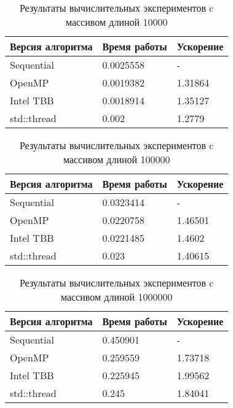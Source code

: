 \documentclass{report}
\begin{document}
\begin{table}[!h]
\caption{Результаты вычислительных экспериментов c массивом длиной 10000}
\centering
\begin{tabular}{| p{5cm} | p{5cm} | p{5cm} |}
\hline
Версия алгоритма & Время работы & Ускорение  \\[5pt]
\hline
Sequential      & 0.0025558      & -            \\
OpenMP          & 0.0019382      & 1.31864      \\
Intel TBB       & 0.0018914      & 1.35127      \\
std::thread     & 0.002          & 1.2779       \\
\hline
\end{tabular}
\end{table}

\begin{table}[!h]
\caption{Результаты вычислительных экспериментов c массивом длиной 100000}
\centering
\begin{tabular}{| p{5cm} | p{5cm} | p{5cm} |}
\hline
Версия алгоритма & Время работы & Ускорение  \\[5pt]
\hline
Sequential      & 0.0323414      & -            \\
OpenMP          & 0.0220758      & 1.46501      \\
Intel TBB       & 0.0221485      & 1.4602       \\
std::thread     & 0.023          & 1.40615      \\
\hline
\end{tabular}
\end{table}

\begin{table}[!h]
\caption{Результаты вычислительных экспериментов c массивом длиной 1000000}
\centering
\begin{tabular}{| p{5cm} | p{5cm} | p{5cm} |}
\hline
Версия алгоритма & Время работы & Ускорение  \\[5pt]
\hline
Sequential      & 0.450901      & -            \\
OpenMP          & 0.259559      & 1.73718      \\
Intel TBB       & 0.225945      & 1.99562      \\
std::thread     & 0.245         & 1.84041      \\
\hline
\end{tabular}
\end{table}
\newpage

\end{document}
